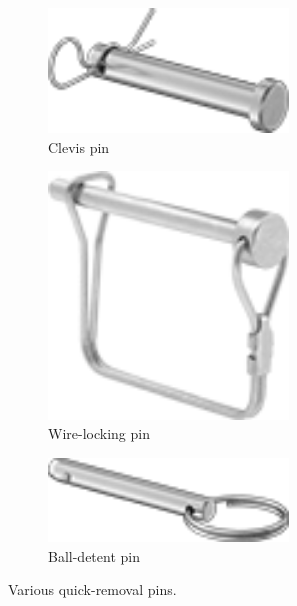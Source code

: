 	\begin{figure}[H]
		\centering
		\begin{subfigure}[b]{.32\linewidth}
			\includegraphics[width=0.7\textwidth]{imgs/cpin.png}
			\caption{Clevis pin}
		\end{subfigure}\begin{subfigure}[b]{.32\linewidth}
			\includegraphics[width=0.7\textwidth]{imgs/wlpin.png}
			\caption{Wire-locking pin}
		\end{subfigure}\begin{subfigure}[b]{.32\linewidth}
			\includegraphics[width=0.7\textwidth]{imgs/bdpin.png}
			\caption{Ball-detent pin}
		\end{subfigure}
		\caption{Various quick-removal pins.}
	\end{figure}
	
